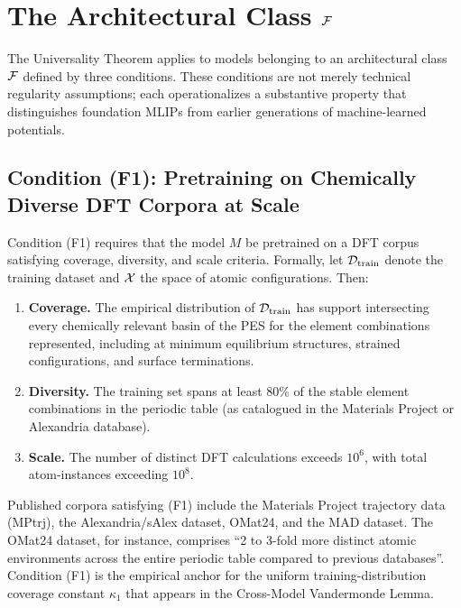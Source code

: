 \section{The Architectural Class $\mathcal{F}$}\label{sec:class-f}

The Universality Theorem applies to models belonging to an architectural class $\mathcal{F}$ defined by three conditions. These conditions are not merely technical regularity assumptions; each operationalizes a substantive property that distinguishes foundation MLIPs from earlier generations of machine-learned potentials.

\subsection{Condition (F1): Pretraining on Chemically Diverse DFT Corpora at Scale}

Condition (F1) requires that the model $M$ be pretrained on a DFT corpus satisfying coverage, diversity, and scale criteria. Formally, let $\mathcal{D}_{\text{train}}$ denote the training dataset and $\mathcal{X}$ the space of atomic configurations. Then:
\begin{enumerate}[label=(F1\alph*)]
    \item \textbf{Coverage.} The empirical distribution of $\mathcal{D}_{\text{train}}$ has support intersecting every chemically relevant basin of the PES for the element combinations represented, including at minimum equilibrium structures, strained configurations, and surface terminations.
    \item \textbf{Diversity.} The training set spans at least 80\% of the stable element combinations in the periodic table (as catalogued in the Materials Project\cite{jain2013materials} or Alexandria database\cite{schmidt2024alexandria}).
    \item \textbf{Scale.} The number of distinct DFT calculations exceeds $10^6$, with total atom-instances exceeding $10^8$.
\end{enumerate}

Published corpora satisfying (F1) include the Materials Project trajectory data (MPtrj)\cite{jain2013materials}, the Alexandria/sAlex dataset\cite{schmidt2024alexandria}, OMat24\cite{barroso2024omat24}, and the MAD dataset\cite{mazitov2025petmad}. The OMat24 dataset, for instance, comprises ``2 to 3-fold more distinct atomic environments across the entire periodic table compared to previous databases''\cite{yang2024mattersim}. Condition (F1) is the empirical anchor for the uniform training-distribution coverage constant $\kappa_1$ that appears in the Cross-Model Vandermonde Lemma.

